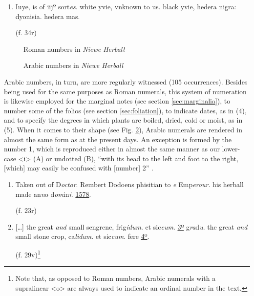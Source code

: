 \begin{paper}
\begin{enumerate}
\item\label{lorente:numlist:3}
Iuye, is of \uline{iijº} sort\emph{es}. white yvie, vnknown to us.
black yvie, hedera nigra: dyonisia. hedera mas. 
\begin{flushright}
    (f. 34r)
\end{flushright}
\end{enumerate}

\begin{figure}[H]
  \centering
    \caption{Roman numbers in \emph{Niewe Herball}}
    \label{fig:lorente45}
    \end{figure}

\begin{figure}[H]
  \centering
    \caption{Arabic numbers in \emph{Niewe Herball}}
    \label{fig:lorente46}
    \end{figure}

Arabic numbers, in turn, are more regularly witnessed (105 occurrences). Besides being used for the same purposes as Roman numerals, this
system of numeration is likewise employed for the marginal notes (see
section \ref{sec:marginalia}), to number some of the folios (see section \ref{sec:foliation}), to
indicate dates, as in (4), and to specify the degrees in which plants
are boiled, dried, cold or moist, as in (5). When it comes to their
shape (see Fig. \ref{fig:lorente46}), Arabic numerals are rendered in almost the same form as at
the present days. An exception is formed by the number 1, which is reproduced either in almost
the same manner as our lower-case \textless i\textgreater{} (A) or
undotted (B), ``with its head to the left and foot to the right,
{[}which{]} may easily be confused with {[}number{]} 2'' \citep[268]{jenkinson_use_1926} .

\begin{enumerate}
\def\labelenumi{(\arabic{enumi})}
\setcounter{enumi}{3}
\item\label{lorente:numlist:4}
Taken out of D\emph{octor}. Rembert Dodoens phisitian to \th\emph{e}
Emp\emph{erour}. his herball made an\emph{n}o d\emph{om}in\emph{i}.
\uline{1578}. 
\begin{flushright}
    (f. 23r)
\end{flushright}

\item\label{lorente:numlist:5}
{[}\ldots{]} the great \emph{and} small sengrene, frig\emph{idum}.
et sic\emph{cum}. \uline{3º} g\emph{ra}d\emph{u}. the great \emph{and}
small stone crop, ca\emph{lidum}. et sic\emph{cum}. fere \uline{4º}.
\begin{flushright}
    (f. 29v)\footnote{Note that, as opposed to Roman numbers, Arabic
  numerals with a supralinear \textless o\textgreater{} are always used
  to indicate an ordinal number in the text.}
\end{flushright}


\end{enumerate}
\end{paper}
